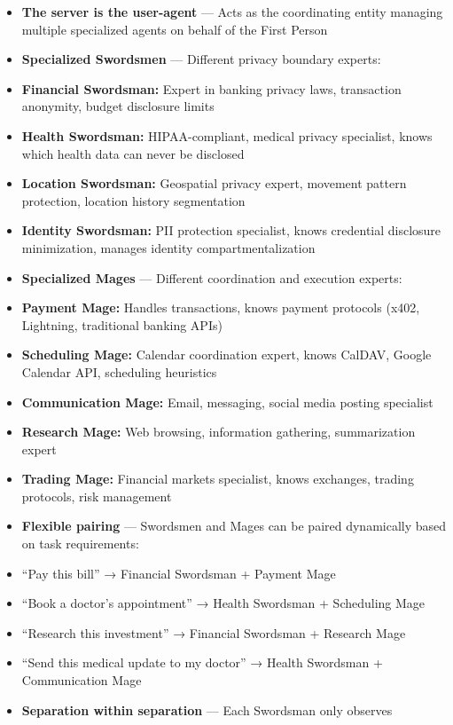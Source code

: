 \documentclass[
]{article}
\begin{document}
\begin{itemize}
\item
  \textbf{The server is the user-agent} --- Acts as the coordinating
  entity managing multiple specialized agents on behalf of the First
  Person
\item
  \textbf{Specialized Swordsmen} --- Different privacy boundary experts:
\item
  \textbf{Financial Swordsman:} Expert in banking privacy laws,
  transaction anonymity, budget disclosure limits
\item
  \textbf{Health Swordsman:} HIPAA-compliant, medical privacy
  specialist, knows which health data can never be disclosed
\item
  \textbf{Location Swordsman:} Geospatial privacy expert, movement
  pattern protection, location history segmentation
\item
  \textbf{Identity Swordsman:} PII protection specialist, knows
  credential disclosure minimization, manages identity
  compartmentalization
\item
  \textbf{Specialized Mages} --- Different coordination and execution
  experts:
\item
  \textbf{Payment Mage:} Handles transactions, knows payment protocols
  (x402, Lightning, traditional banking APIs)
\item
  \textbf{Scheduling Mage:} Calendar coordination expert, knows CalDAV,
  Google Calendar API, scheduling heuristics
\item
  \textbf{Communication Mage:} Email, messaging, social media posting
  specialist
\item
  \textbf{Research Mage:} Web browsing, information gathering,
  summarization expert
\item
  \textbf{Trading Mage:} Financial markets specialist, knows exchanges,
  trading protocols, risk management
\item
  \textbf{Flexible pairing} --- Swordsmen and Mages can be paired
  dynamically based on task requirements:
\item
  ``Pay this bill'' → Financial Swordsman + Payment Mage
\item
  ``Book a doctor's appointment'' → Health Swordsman + Scheduling Mage
\item
  ``Research this investment'' → Financial Swordsman + Research Mage
\item
  ``Send this medical update to my doctor'' → Health Swordsman +
  Communication Mage
\item
  \textbf{Separation within separation} --- Each Swordsman only observes

\end{itemize}
\end{document}
